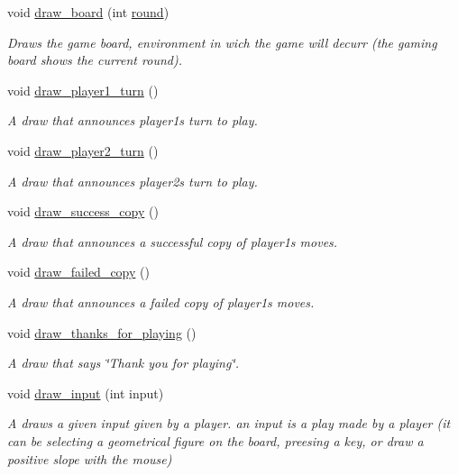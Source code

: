 \begin{DoxyCompactItemize}
void \hyperlink{group___bitmap_gaa7519d8a181750afa183c3350c5f9598}{draw\+\_\+board} (int \hyperlink{game_8c_a0b7685156d686874cf7a3f95a6b7f3f3}{round})
\begin{DoxyCompactList}\small\item\em Draws the game board, environment in wich the game will decurr (the gaming board shows the current round). \end{DoxyCompactList}\item 
void \hyperlink{group___bitmap_gaca0d178c01fee283d1e3386b9712736e}{draw\+\_\+player1\+\_\+turn} ()
\begin{DoxyCompactList}\small\item\em A draw that announces player1\textquotesingle{}s turn to play. \end{DoxyCompactList}\item 
void \hyperlink{group___bitmap_ga9af400ed66deb4c3aff712d9a7e9f522}{draw\+\_\+player2\+\_\+turn} ()
\begin{DoxyCompactList}\small\item\em A draw that announces player2\textquotesingle{}s turn to play. \end{DoxyCompactList}\item 
void \hyperlink{group___bitmap_gae696a3d4ee82a15e937f5f8c11fa9057}{draw\+\_\+success\+\_\+copy} ()
\begin{DoxyCompactList}\small\item\em A draw that announces a successful copy of player1\textquotesingle{}s moves. \end{DoxyCompactList}\item 
void \hyperlink{group___bitmap_ga06ba1c351da1ccdfa323137861c1a9af}{draw\+\_\+failed\+\_\+copy} ()
\begin{DoxyCompactList}\small\item\em A draw that announces a failed copy of player1\textquotesingle{}s moves. \end{DoxyCompactList}\item 
void \hyperlink{group___bitmap_gabbf5153c909fc82e7734744352e22de9}{draw\+\_\+thanks\+\_\+for\+\_\+playing} ()
\begin{DoxyCompactList}\small\item\em A draw that says \char`\"{}\+Thank you for playing\char`\"{}. \end{DoxyCompactList}\item 
void \hyperlink{group___bitmap_ga556f9cfc8664aff3169e9775310a5144}{draw\+\_\+input} (int input)
\begin{DoxyCompactList}\small\item\em A draws a given input given by a player. an input is a play made by a player (it can be selecting a geometrical figure on the board, preesing a key, or draw a positive slope with the mouse) \end{DoxyCompactList}\item 

\end{DoxyCompactItemize}
